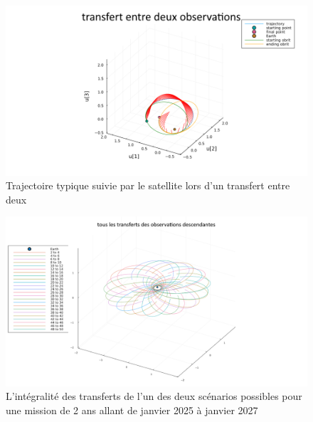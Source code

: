 \documentclass[11pt]{article} %
\begin{document}
		
		\begin{figure}[H]
			\centering
			\includegraphics[width=0.9\linewidth]{images/Transfert_23_25}
			\caption{Trajectoire typique suivie par le satellite lors d'un transfert entre deux}
		\end{figure}
		\begin{figure}[H]
			\includegraphics[width=0.9\linewidth]{images/All_transfert_even_48_50}
			\caption{L'intégralité des transferts de l'un des deux scénarios possibles pour une mission de 2 ans allant de janvier 2025 à janvier 2027}
		\end{figure}
		\newpage
\end{document}
